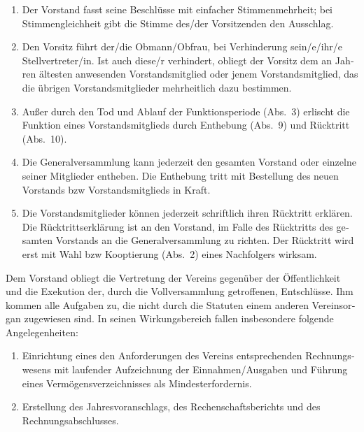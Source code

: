 \begin{otherlanguage}{german}
\begin{enumerate}[statutenenum]
    \item Der Vorstand fasst seine Beschlüsse mit einfacher Stimmenmehrheit;
        bei Stimmengleichheit gibt die Stimme des/der Vorsitzenden den Ausschlag.

    \item Den Vorsitz führt der/die Obmann/Obfrau, bei Verhinderung sein/e/ihr/e Stellvertreter/in.
        Ist auch diese/r verhindert, obliegt der Vorsitz dem an Jahren ältesten anwesenden Vorstandsmitglied oder jenem Vorstandsmitglied, das die übrigen Vorstandsmitglieder mehrheitlich dazu bestimmen.

    \item Außer durch den Tod und Ablauf der Funktionsperiode (Abs.\ 3) erlischt die Funktion eines Vorstandsmitglieds durch Enthebung (Abs.\ 9) und Rücktritt (Abs.\ 10).

    \item Die Generalversammlung kann jederzeit den gesamten Vorstand oder einzelne seiner Mitglieder entheben.
        Die Enthebung tritt mit Bestellung des neuen Vorstands bzw Vorstandsmitglieds in Kraft.

    \item Die Vorstandsmitglieder können jederzeit schriftlich ihren Rücktritt erklären.
        Die Rücktrittserklärung ist an den Vorstand, im Falle des Rücktritts des gesamten Vorstands an die Generalversammlung zu richten.
        Der Rücktritt wird erst mit Wahl bzw Kooptierung (Abs.\ 2) eines Nachfolgers wirksam.
\end{enumerate}


Dem Vorstand obliegt die Vertretung der Vereins gegenüber der Öffentlichkeit und die Exekution der, durch die Vollversammlung getroffenen, Entschlüsse.
Ihm kommen alle Aufgaben zu, die nicht durch die Statuten einem anderen Vereinsorgan zugewiesen sind.
In seinen Wirkungsbereich fallen insbesondere folgende Angelegenheiten:

\begin{enumerate}[statutenenum]
    \item Einrichtung eines den Anforderungen des Vereins entsprechenden Rechnungswesens mit laufender Aufzeichnung der Einnahmen/Ausgaben und Führung eines Vermögensverzeichnisses als Mindesterfordernis.

    \item Erstellung des Jahresvoranschlags, des Rechenschaftsberichts und des Rechnungsabschlusses.


\end{enumerate}
\end{otherlanguage}
